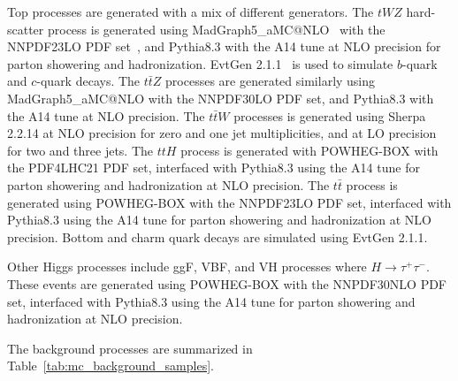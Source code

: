 Top processes are generated with a mix of different generators. The $tWZ$ hard-scatter process is generated using MadGraph5\_aMC@NLO~\cite{Alwall:2011uj} with the NNPDF23LO PDF set~\cite{Ball:2012cx}, and Pythia8.3 with the A14 tune at NLO precision for parton showering and hadronization. EvtGen 2.1.1~\cite{Lange:2001uf} is used to simulate $b$-quark and $c$-quark decays. The $t\bar{t}Z$ processes are generated similarly using MadGraph5\_aMC@NLO with the NNPDF30LO PDF set, and Pythia8.3 with the A14 tune at NLO precision. The $t\bar{t}W$ processes is generated using Sherpa 2.2.14 at NLO precision for zero and one jet multiplicities, and at LO precision for two and three jets. The $ttH$ process is generated with POWHEG-BOX with the PDF4LHC21 PDF set, interfaced with Pythia8.3 using the A14 tune for parton showering and hadronization at NLO precision. The $t\bar{t}$ process is generated using POWHEG-BOX with the NNPDF23LO PDF set, interfaced with Pythia8.3 using the A14 tune for parton showering and hadronization at NLO precision. Bottom and charm quark decays are simulated using EvtGen 2.1.1.

Other Higgs processes include ggF, VBF, and VH processes where $H \rightarrow \tau^{+}\tau^{-}$. These events are generated using POWHEG-BOX with the NNPDF30NLO PDF set, interfaced with Pythia8.3 using the A14 tune for parton showering and hadronization at NLO precision.

The background processes are summarized in Table~\ref{tab:mc_background_samples}.

